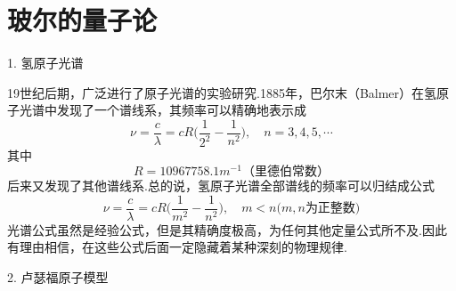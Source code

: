 \section[玻尔的量子论]{玻尔的量子论}\label{sec:01.03}

\textsf{1. 氢原子光谱}

19世纪后期，广泛进行了原子光谱的实验研究.1885年，巴尔末（Balmer）在氢原子光谱中发现了一个谱线系，其频率可以精确地表示成
\begin{equation}\label{eqn:01.03.01}
	\nu=\frac{c}{\lambda}=cR\bigg( \frac{1}{2^2}-\frac{1}{n^2} \bigg),\quad n=3,4,5,\cdots
\end{equation}
其中
\begin{equation*}
	R=\num{10967758.1} \si{m^{-1}} \text{（里德伯常数）}
\end{equation*}
后来又发现了其他谱线系.总的说，氢原子光谱全部谱线的频率可以归结成公式
\setlength{\mathindent}{6em}
\begin{equation}\label{eqn:01.03.02}
	\nu=\frac{c}{\lambda}=cR\bigg( \frac{1}{m^2}-\frac{1}{n^2} \bigg),\quad m<n \text{($m,n$为正整数)}
\end{equation}
\eqnormal
光谱公式虽然是经验公式，但是其精确度极高，为任何其他定量公式所不及.因此有理由相信，在这些公式后面一定隐藏着某种深刻的物理规律.

\textsf{2. 卢瑟福原子模型}


